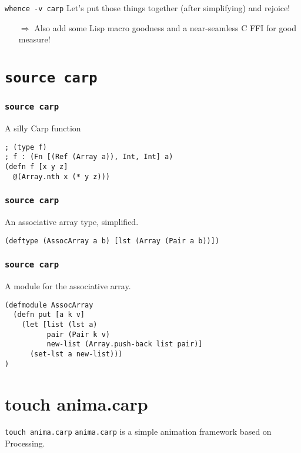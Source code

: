 \documentclass[aspectratio=169]{beamer}
\begin{document}
  \begin{frame}{\texttt{whence -v carp}}
    Let’s put those things together (after simplifying) and rejoice!
    \begin{itemize}
      \item[$\Rightarrow$] Also add some Lisp macro goodness and a near-seamless C FFI for good measure!
    \end{itemize}
  \end{frame}
  \section{\texttt{source carp}}
  \begin{frame}[fragile]
  \frametitle{\texttt{source carp}}
    \begin{listing}[H]
      \caption{A silly Carp function}
      \begin{verbatim}
; (type f)
; f : (Fn [(Ref (Array a)), Int, Int] a)
(defn f [x y z]
  @(Array.nth x (* y z)))
      \end{verbatim}
    \end{listing}
  \end{frame}
  \begin{frame}[fragile]
    \frametitle{\texttt{source carp}}
    \begin{listing}[H]
      \caption{An associative array type, simplified.}
      \begin{verbatim}
(deftype (AssocArray a b) [lst (Array (Pair a b))])
      \end{verbatim}
    \end{listing}
  \end{frame}
  \begin{frame}[fragile]
    \frametitle{\texttt{source carp}}
    \begin{listing}[H]
      \caption{A module for the associative array.}
      \begin{verbatim}
(defmodule AssocArray
  (defn put [a k v]
    (let [list (lst a)
          pair (Pair k v)
          new-list (Array.push-back list pair)]
      (set-lst a new-list)))
)
      \end{verbatim}
    \end{listing}
  \end{frame}
  \section{touch anima.carp}
  \begin{frame}{\texttt{touch anima.carp}}
    \texttt{anima.carp} is a simple animation framework based on Processing.
  \end{frame}
\end{document}
